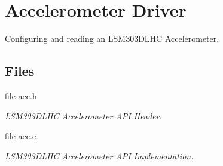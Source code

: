 \hypertarget{group__acc}{\section{Accelerometer Driver}
\label{group__acc}
}


Configuring and reading an L\-S\-M303\-D\-L\-H\-C Accelerometer.  


\subsection*{Files}
\begin{DoxyCompactItemize}
\item 
file \hyperlink{acc_8h}{acc.\-h}
\begin{DoxyCompactList}\small\item\em L\-S\-M303\-D\-L\-H\-C Accelerometer A\-P\-I Header. \end{DoxyCompactList}\item 
file \hyperlink{acc_8c}{acc.\-c}
\begin{DoxyCompactList}\small\item\em L\-S\-M303\-D\-L\-H\-C Accelerometer A\-P\-I Implementation. \end{DoxyCompactList}\end{DoxyCompactItemize}
